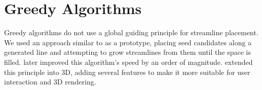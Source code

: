 \section{Greedy Algorithms}
Greedy algorithms do not use a global guiding principle for streamline placement.
We used an approach similar to \cite{Jobard} as a prototype,
placing seed candidates along a generated line and attempting to grow streamlines 
from them until the space is filled.
\cite{4015453} later improved this algorithm's speed by an order of magnitude.
\cite{Mattausch} extended this principle into 3D,
adding several features to make it more suitable for user interaction and 3D rendering.





